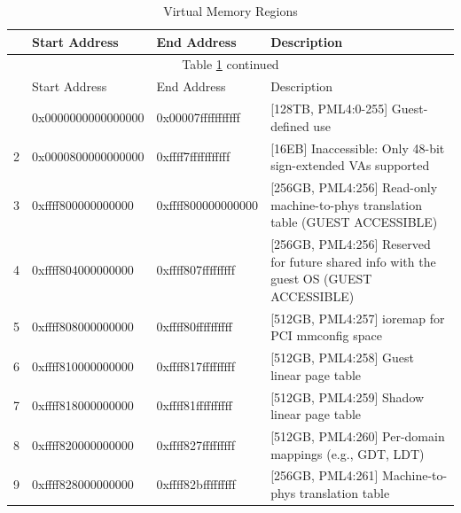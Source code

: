 \clearpage
\begin{longtable}{|m{2ex}|m{20ex}|m{18ex}|m{}|}
    \caption[Virtual Memory Regions]{Virtual Memory Regions \cite{xen_code} \label{tab:xen_address}}\\
    \hline
    & Start Address      & End Address        & Description \\
    \hline
    \hline
    \endfirsthead
    \multicolumn{4}{c}{Table \ref{tab:xen_address} continued}\\
    \hline
    & Start Address      & End Address        & Description \\
    \hline
    \hline
    \endhead
    \endfoot
    \hline
    \endlastfoot
    1  & 0x0000000000000000  & 0x00007fffffffffff & [128TB, PML4:0-255] Guest-defined use \\
    \hline
    2  & 0x0000800000000000  & 0xffff7fffffffffff & [16EB] Inaccessible: Only 48-bit sign-extended VAs supported\\
    \hline
    3  & 0xffff800000000000  & 0xffff800000000000 & [256GB, PML4:256] Read-only machine-to-phys translation table (GUEST ACCESSIBLE) \\
    \hline
    4  & 0xffff804000000000  & 0xffff807fffffffff & [256GB, PML4:256] Reserved for future shared info with the guest OS (GUEST ACCESSIBLE) \\
    \hline
    5  & 0xffff808000000000  & 0xffff80ffffffffff & [512GB, PML4:257] ioremap for PCI mmconfig space \\
    \hline
    6  & 0xffff810000000000  & 0xffff817fffffffff & [512GB, PML4:258] Guest linear page table \\
    \hline
    7  & 0xffff818000000000  & 0xffff81ffffffffff & [512GB, PML4:259] Shadow linear page table \\
    \hline
    8  & 0xffff820000000000  & 0xffff827fffffffff & [512GB, PML4:260] Per-domain mappings (e.g., GDT, LDT) \\
    \hline
    9  & 0xffff828000000000  & 0xffff82bfffffffff & [256GB, PML4:261] Machine-to-phys translation table \\

\end{longtable}

